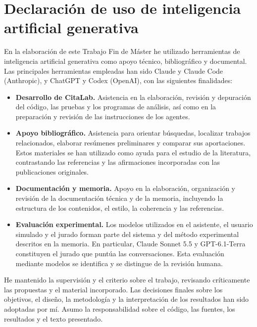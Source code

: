 \chapter*{Declaración de uso de inteligencia artificial generativa}

En la elaboración de este Trabajo Fin de Máster he utilizado herramientas de
inteligencia artificial generativa como apoyo técnico, bibliográfico y
documental. Las principales herramientas empleadas han sido Claude y Claude
Code (Anthropic), y ChatGPT y Codex (OpenAI), con las siguientes finalidades:

\begin{itemize}
  \item \textbf{Desarrollo de CitaLab.} Asistencia en la elaboración, revisión
        y depuración del código, las pruebas y los programas de análisis, así
        como en la preparación y revisión de las instrucciones de los agentes.
  \item \textbf{Apoyo bibliográfico.} Asistencia para orientar búsquedas,
        localizar trabajos relacionados, elaborar resúmenes preliminares y
        comparar sus aportaciones. Estos materiales se han utilizado como ayuda
        para el estudio de la literatura, contrastando las referencias y las
        afirmaciones incorporadas con las publicaciones originales.
  \item \textbf{Documentación y memoria.} Apoyo en la elaboración, organización
        y revisión de la documentación técnica y de la memoria, incluyendo la
        estructura de los contenidos, el estilo, la coherencia y las
        referencias.
  \item \textbf{Evaluación experimental.} Los modelos utilizados en el
        asistente, el usuario simulado y el jurado forman parte del sistema y
        del método experimental descritos en la memoria. En particular, Claude
        Sonnet 5.5 y GPT-6.1-Terra constituyen el jurado que puntúa las
        conversaciones. Esta evaluación mediante modelos se identifica y se
        distingue de la revisión humana.
\end{itemize}

He mantenido la supervisión y el criterio sobre el trabajo, revisando
críticamente las propuestas y el material incorporado. Las decisiones finales
sobre los objetivos, el diseño, la metodología y la interpretación de los
resultados han sido adoptadas por mí. Asumo la responsabilidad sobre el
código, las fuentes, los resultados y el texto presentado.
